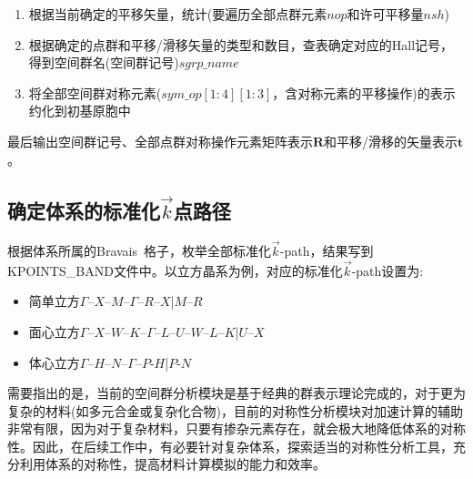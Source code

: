 \documentclass{article}      %
\begin{document}
\begin{enumerate}
	\item 根据当前确定的平移矢量，统计(要遍历全部点群元素$\mathit{nop}$和许可平移量$\mathit{nsh}$)
	\item 根据确定的点群和平移/滑移矢量的类型和数目，查表确定对应的\textrm{Hall}记号，得到空间群名(空间群记号)$\mathit{sgrp\_name}$
	\item 将全部空间群对称元素($\mathit{sym\_op}[1:4][1:3]$，含对称元素的平移操作)的表示约化到初基原胞中
\end{enumerate}
最后输出空间群记号、全部点群对称操作元素矩阵表示$\mathbf{R}$和平移/滑移的矢量表示$\mathbf{t}$。

\subsection{确定体系的标准化$\vec k$点路径}
根据体系所属的\textrm{Bravais~}格子，枚举全部标准化$\vec k$-\textrm{path}，结果写到\textrm{KPOINTS\_BAND}文件中。以立方晶系为例，对应的标准化$\vec k$-\textrm{path}设置为:~
\begin{itemize}
	\item 简单立方\quad $\Gamma$–$X$–$M$–$\Gamma$–$R$–$X$|$M$–$R$
	\item 面心立方\quad $\Gamma$–$X$–$W$–$K$–$\Gamma$–$L$–$U$–$W$–$L$–$K$|$U$–$X$
	\item 体心立方\quad $\Gamma$–$H$–$N$–$\Gamma$–$P$-$H$|$P$-$N$
\end{itemize}

需要指出的是，当前的空间群分析模块是基于经典的群表示理论完成的，对于更为复杂的材料(如多元合金或复杂化合物)，目前的对称性分析模块对加速计算的辅助非常有限，因为对于复杂材料，只要有掺杂元素存在，就会极大地降低体系的对称性。因此，在后续工作中，有必要针对复杂体系，探索适当的对称性分析工具，充分利用体系的对称性，提高材料计算模拟的能力和效率。
\end{document}
